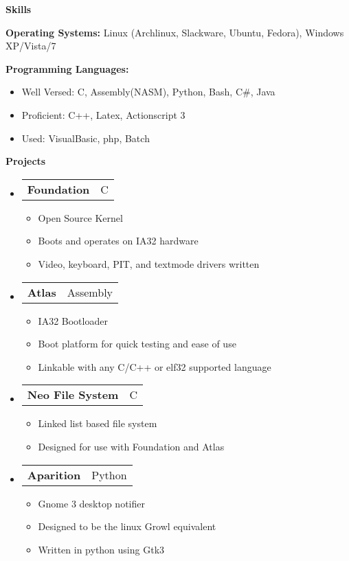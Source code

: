 \documentclass[letterpaper,11pt]{article}
\makeatletter
\newcommand{\resheading}[1]{{\large \colorbox{mygrey}{\begin{minipage}{\textwidth}{\textbf{#1 \vphantom{p\^{E}}}}\end{minipage}}}}
\newcommand{\restwoheading}[2]{{\large \colorbox{mygrey}{\begin{minipage}{\textwidth}{\textbf{#1 \vphantom{p\^{E}}}}\end{minipage}}}}
\newcommand{\restwosubheading}[2]{
\begin{tabular*}{6.5in}{l@{\extracolsep{\fill}}r}
		\textbf{#1} & #2 \\
\end{tabular*}\vspace{-6pt}}
\makeatother
\begin{document}
\resheading{{Skills}}
{ \footnotesize
	\begin{description}
		\item{\textbf{Operating Systems: }{Linux (Archlinux, Slackware, Ubuntu, Fedora), Windows XP/Vista/7}}
		\item{\textbf{Programming Languages: }}
			\begin{itemize}
				\item{Well Versed: }{C, Assembly(NASM), Python, Bash, C\#, Java}
				\item{Proficient: }{C++, Latex, Actionscript 3}
				\item{Used: }{VisualBasic, php, Batch}
			\end{itemize}
	\end{description}
}
\restwoheading{Projects}{TEST}	
{ \footnotesize
	\begin{itemize}
		\item 
		\restwosubheading{Foundation}{C}
			\begin{itemize}
				\item{Open Source Kernel}
				\item{Boots and operates on IA32 hardware}
				\item{Video, keyboard, PIT, and textmode drivers written}
			\end{itemize}
		\item		
		\restwosubheading{Atlas}{Assembly}
			\begin{itemize}
				\item{IA32 Bootloader} 
				\item{Boot platform for quick testing and ease of use}
				\item{Linkable with any C/C++ or elf32 supported language}
			\end{itemize}
		\item
		\restwosubheading{Neo File System}{C}				
			\begin{itemize}
				\item{Linked list based file system}
				\item{Designed for use with Foundation and Atlas}
			\end{itemize}
		\item
		\restwosubheading{Aparition}{Python}
			\begin{itemize}
				\item{Gnome 3 desktop notifier}
				\item{Designed to be the linux Growl equivalent}
				\item{Written in python using Gtk3}
			\end{itemize}
	\end{itemize}
}

\end{document}
